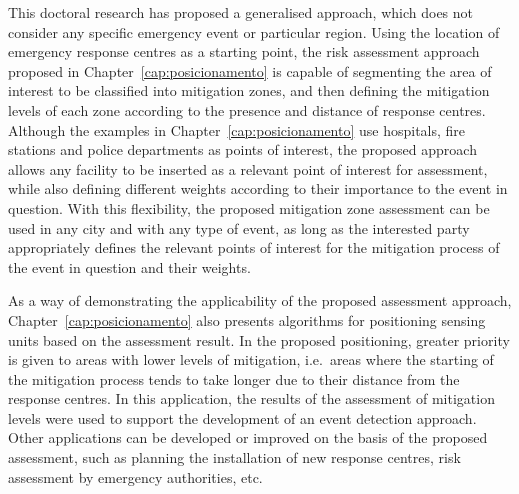 This doctoral research has proposed a generalised approach, which does not consider any specific emergency event or particular region. Using the location of emergency response centres as a starting point, the risk assessment approach proposed in Chapter~\ref{cap:posicionamento} is capable of segmenting the area of interest to be classified into mitigation zones, and then defining the mitigation levels of each zone according to the presence and distance of response centres. Although the examples in Chapter~\ref{cap:posicionamento} use hospitals, fire stations and police departments as points of interest, the proposed approach allows any facility to be inserted as a relevant point of interest for assessment, while also defining different weights according to their importance to the event in question. With this flexibility, the proposed mitigation zone assessment can be used in any city and with any type of event, as long as the interested party appropriately defines the relevant points of interest for the mitigation process of the event in question and their weights.


As a way of demonstrating the applicability of the proposed assessment approach, Chapter~\ref{cap:posicionamento} also presents algorithms for positioning sensing units based on the assessment result. In the proposed positioning, greater priority is given to areas with lower levels of mitigation, i.e.\ areas where the starting of the mitigation process tends to take longer due to their distance from the response centres. In this application, the results of the assessment of mitigation levels were used to support the development of an event detection approach. Other applications can be developed or improved on the basis of the proposed assessment, such as planning the installation of new response centres, risk assessment by emergency authorities, etc.

